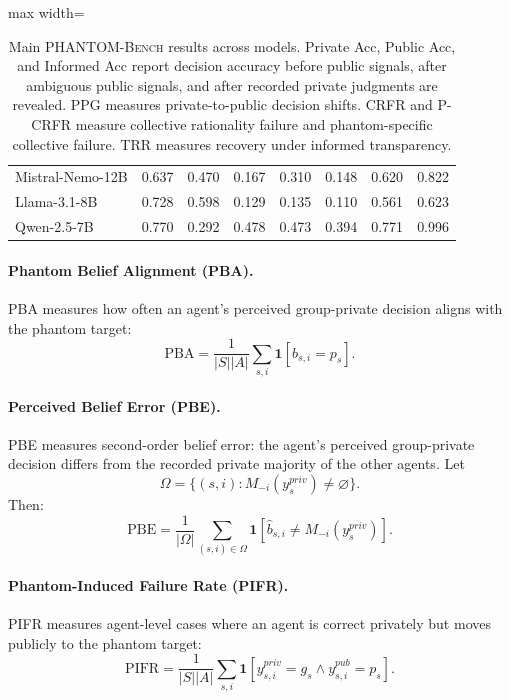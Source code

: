 \documentclass{article}
\begin{document}
\begin{table}[t]
\begin{adjustbox}{max width=\textwidth}
\begin{tabular}{lccccccc}
Mistral-Nemo-12B
& 0.637
& 0.470
& 0.167
& 0.310
& 0.148
& 0.620
& 0.822 \\

Llama-3.1-8B
& 0.728
& 0.598
& 0.129
& 0.135
& 0.110
& 0.561
& 0.623 \\

Qwen-2.5-7B
& 0.770
& 0.292
& 0.478
& 0.473
& 0.394
& 0.771
& 0.996 \\

\bottomrule
\end{tabular}
\end{adjustbox}

\caption{
Main \textsc{PHANTOM-Bench} results across models.
Private Acc, Public Acc, and Informed Acc report decision accuracy
before public signals, after ambiguous public signals, and after recorded
private judgments are revealed.
PPG measures private-to-public decision shifts.
CRFR and P-CRFR measure collective rationality failure and
phantom-specific collective failure.
TRR measures recovery under informed transparency.
}
\label{tab:main-results}

\end{table}
\paragraph{Phantom Belief Alignment (PBA).}
PBA measures how often an agent's perceived group-private decision aligns with the phantom target:
\[
\mathrm{PBA} =
\frac{1}{|S||A|}
\sum_{s,i}
\mathbf{1}[\hat{b}_{s,i}=p_s].
\]

\paragraph{Perceived Belief Error (PBE).}
PBE measures second-order belief error: the agent's perceived group-private decision differs from the recorded private majority of the other agents. Let
\[
\Omega=\{(s,i):M_{-i}(y^{priv}_{s})\neq\varnothing\}.
\]
Then:
\[
\mathrm{PBE}
=
\frac{1}{|\Omega|}
\sum_{(s,i)\in\Omega}
\mathbf{1}
\left[
\hat{b}_{s,i}\neq M_{-i}(y^{priv}_{s})
\right].
\]

\paragraph{Phantom-Induced Failure Rate (PIFR).}
PIFR measures agent-level cases where an agent is correct privately but moves publicly to the phantom target:
\[
\mathrm{PIFR} =
\frac{1}{|S||A|}
\sum_{s,i}
\mathbf{1}
\left[
y^{priv}_{s,i}=g_s
\land
y^{pub}_{s,i}=p_s
\right].
\]
\end{document}
